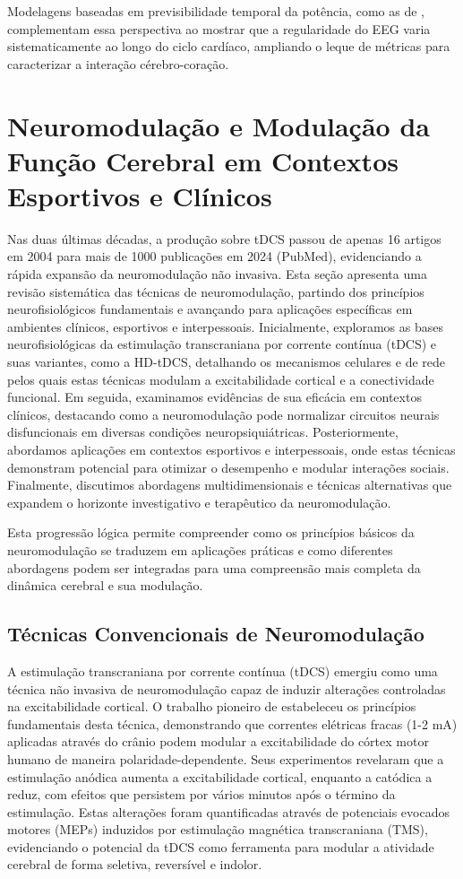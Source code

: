 Modelagens baseadas em previsibilidade temporal da potência, como as de , complementam essa perspectiva ao mostrar que a regularidade do EEG varia sistematicamente ao longo do ciclo cardíaco, ampliando o leque de métricas para caracterizar a interação cérebro-coração.

\section{Neuromodulação e Modulação da Função Cerebral em Contextos Esportivos e Clínicos}
Nas duas últimas décadas, a produção sobre tDCS passou de apenas 16 artigos em 2004 para mais de 1000 publicações em 2024 (PubMed), evidenciando a rápida expansão da neuromodulação não invasiva. Esta seção apresenta uma revisão sistemática das técnicas de neuromodulação, partindo dos princípios neurofisiológicos fundamentais e avançando para aplicações específicas em ambientes clínicos, esportivos e interpessoais. Inicialmente, exploramos as bases neurofisiológicas da estimulação transcraniana por corrente contínua (tDCS) e suas variantes, como a HD-tDCS, detalhando os mecanismos celulares e de rede pelos quais estas técnicas modulam a excitabilidade cortical e a conectividade funcional. Em seguida, examinamos evidências de sua eficácia em contextos clínicos, destacando como a neuromodulação pode normalizar circuitos neurais disfuncionais em diversas condições neuropsiquiátricas. Posteriormente, abordamos aplicações em contextos esportivos e interpessoais, onde estas técnicas demonstram potencial para otimizar o desempenho e modular interações sociais. Finalmente, discutimos abordagens multidimensionais e técnicas alternativas que expandem o horizonte investigativo e terapêutico da neuromodulação. 

Esta progressão lógica permite compreender como os princípios básicos da neuromodulação se traduzem em aplicações práticas e como diferentes abordagens podem ser integradas para uma compreensão mais completa da dinâmica cerebral e sua modulação.

\subsection{Técnicas Convencionais de Neuromodulação}
A estimulação transcraniana por corrente contínua (tDCS) emergiu como uma técnica não invasiva de neuromodulação capaz de induzir alterações controladas na excitabilidade cortical. O trabalho pioneiro de  estabeleceu os princípios fundamentais desta técnica, demonstrando que correntes elétricas fracas (1-2 mA) aplicadas através do crânio podem modular a excitabilidade do córtex motor humano de maneira polaridade-dependente. Seus experimentos revelaram que a estimulação anódica aumenta a excitabilidade cortical, enquanto a catódica a reduz, com efeitos que persistem por vários minutos após o término da estimulação. Estas alterações foram quantificadas através de potenciais evocados motores (MEPs) induzidos por estimulação magnética transcraniana (TMS), evidenciando o potencial da tDCS como ferramenta para modular a atividade cerebral de forma seletiva, reversível e indolor.

